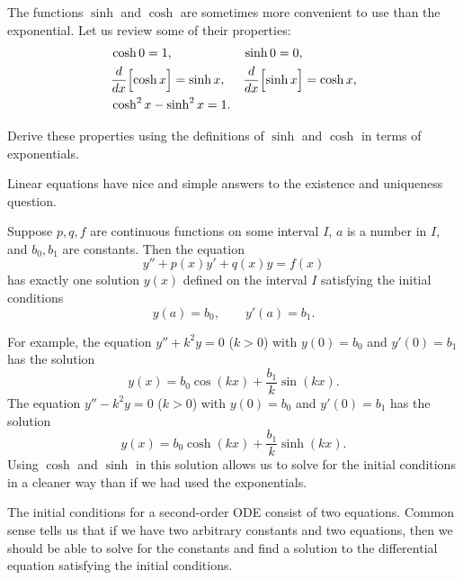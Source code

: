 The functions $\sinh$ and $\cosh$ are sometimes more convenient to use than the
exponential.  Let us review some of their properties:
\begin{align*}
& \cosh 0  = 1 , &   & \sinh 0 = 0 , \\
& \frac{d}{dx} \Bigl[ \cosh x \Bigr] = \sinh x , &  & \frac{d}{dx} \Bigl[ \sinh x \Bigr] = \cosh x , \\
& \cosh^2 x - \sinh^2 x = 1 .
\end{align*}


\begin{exercise}
Derive these properties using the definitions of $\sinh$
and $\cosh$ in terms of exponentials.
\end{exercise}


Linear equations have nice and simple
answers to the existence and uniqueness question.

\begin{theorem}
Suppose $p, q, f$ are continuous functions on some interval
$I$, $a$ is a number in $I$,
and $b_0, b_1$ are constants.
Then the equation
\begin{equation*}
y'' + p(x) y' + q(x) y = f(x)
\end{equation*}
has exactly one solution $y(x)$ defined on the interval $I$ satisfying the initial conditions
\begin{equation*}
y(a) = b_0 , \qquad y'(a) = b_1 .
\end{equation*}
\end{theorem}

For example, the equation $y'' + k^2 y = 0$ ($k > 0$) with $y(0) = b_0$ and $y'(0) = b_1$
has the solution
\begin{equation*}
y(x) = b_0 \cos (kx) + \frac{b_1}{k} \sin (kx) .
\end{equation*}
The equation $y'' - k^2 y = 0$ ($k > 0$) with $y(0) = b_0$ and $y'(0) = b_1$
has the solution
\begin{equation*}
y(x) = b_0 \cosh (kx) + \frac{b_1}{k} \sinh (kx) .
\end{equation*}
Using $\cosh$ and $\sinh$ in this solution allows us to solve for
the initial conditions
in a cleaner way
than if we had used the exponentials.

\medskip

The initial conditions for a second-order ODE consist of two
equations.  Common sense tells us that
if we have two arbitrary constants and two equations, then we should 
be able to solve
for the constants and find a solution to the differential equation
satisfying the initial conditions.

